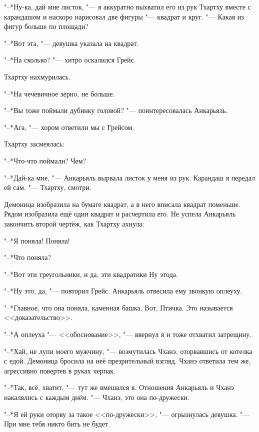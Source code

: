 "--*Ну-ка, дай мне листок, "--- я аккуратно выхватил его из рук Тхартху вместе с карандашом и наскоро нарисовал две фигуры "--- квадрат и круг.
"--- Какая из фигур больше по площади?

"--*Вот эта, "--- девушка указала на квадрат.

"--*На сколько? "--- хитро оскалился Грейс.

Тхартху нахмурилась.

"--*На чечевичное зерно, не больше.

"--*Вы тоже поймали дубинку головой\footnotemark? "--- поинтересовалась Анкарьяль.

"--*Ага, "--- хором ответили мы с Грейсом.

Тхартху засмеялась:

"--*Что-что поймали?
Чем?

"--*Дай-ка мне, "--- Анкарьяль вырвала листок у меня из рук.
Карандаш я передал ей сам.
"--- Тхартху, смотри.

Демоница изобразила на бумаге квадрат, а в него вписала квадрат поменьше.
Рядом изобразила ещё один квадрат и расчертила его.
Не успела Анкарьяль закончить второй чертёж, как Тхартху ахнула:

"--*Я поняла!
Поняла!

"--*Что поняла?

"--*Вот эти треугольники, и да, эти квадратики\ldotse
Ну это\ldotst да.

"--*Ну это, да, "--- повторил Грейс.
Анкарьяль отвесила ему звонкую оплеуху.

"--*Главное, что она поняла, каменная башка.
Вот, Птичка.
Это называется <<доказательство>>.

"--*А оплеуха "--- <<обоснование>>, "--- ввернул я и тоже отхватил затрещину.

"--*Хай, не лупи моего мужчину, "--- возмутилась Чханэ, оторвавшись от котелка с едой.
Демоница бросила на неё презрительный взгляд.
Чханэ ответила тем же, агрессивно повертев в руках черпак.

"--*Так, всё, хватит, "--- тут же вмешался я.
Отношения Анкарьяль и Чханэ накалялись с каждым днём.
"--- Чханэ, это она по-дружески.

"--*Я ей руки оторву за такое <<по-дружески>>, "--- огрызнулась девушка.
"--- При мне тебя никто бить не будет.


